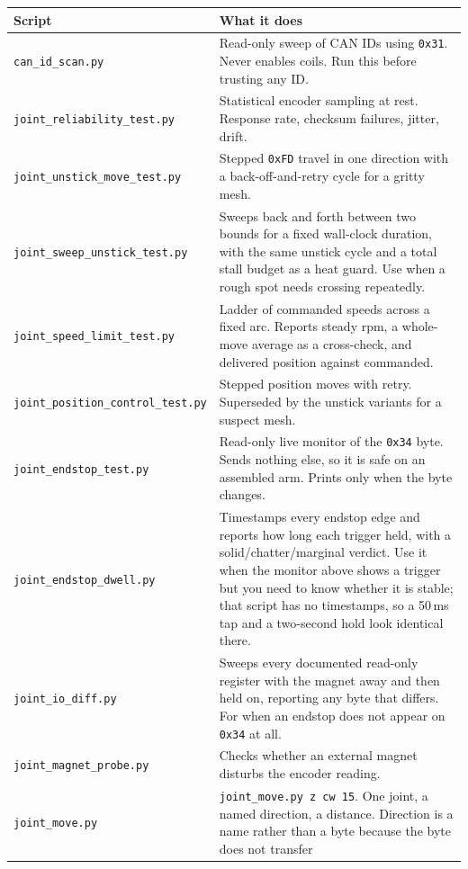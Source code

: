 \documentclass[11pt,letterpaper]{article}
\begin{document}
\begin{longtable}{p{}p{}}
\toprule
\textbf{Script} & \textbf{What it does} \\ \midrule
\endhead
\texttt{can\_id\_scan.py} &
  Read-only sweep of CAN IDs using \texttt{0x31}. Never enables coils. Run this
  before trusting any ID. \\
\texttt{joint\_reliability\_test.py} &
  Statistical encoder sampling at rest. Response rate, checksum failures, jitter,
  drift. \\
\texttt{joint\_unstick\_move\_test.py} &
  Stepped \texttt{0xFD} travel in one direction with a back-off-and-retry cycle for
  a gritty mesh. \\
\texttt{joint\_sweep\_unstick\_test.py} &
  Sweeps back and forth between two bounds for a fixed wall-clock duration, with the
  same unstick cycle and a total stall budget as a heat guard. Use when a rough spot
  needs crossing repeatedly. \\
\texttt{joint\_speed\_limit\_test.py} &
  Ladder of commanded speeds across a fixed arc. Reports steady rpm, a whole-move
  average as a cross-check, and delivered position against commanded. \\
\texttt{joint\_position\_control\_test.py} &
  Stepped position moves with retry. Superseded by the unstick variants for a
  suspect mesh. \\
\texttt{joint\_endstop\_test.py} &
  Read-only live monitor of the \texttt{0x34} byte. Sends nothing else, so it is safe
  on an assembled arm. Prints only when the byte changes. \\
\texttt{joint\_endstop\_dwell.py} &
  Timestamps every endstop edge and reports how long each trigger held, with a
  solid/chatter/marginal verdict. Use it when the monitor above shows a trigger but
  you need to know whether it is stable; that script has no timestamps, so a 50\,ms
  tap and a two-second hold look identical there. \\
\texttt{joint\_io\_diff.py} &
  Sweeps every documented read-only register with the magnet away and then held on,
  reporting any byte that differs. For when an endstop does not appear on
  \texttt{0x34} at all. \\
\texttt{joint\_magnet\_probe.py} &
  Checks whether an external magnet disturbs the encoder reading. \\
\texttt{joint\_move.py} &
  \texttt{joint\_move.py z cw 15}. One joint, a named direction, a distance.
  Direction is a name rather than a byte because the byte does not transfer

\end{longtable}
\end{document}
